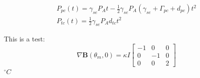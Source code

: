 \documentclass[pdftex,letterpaper,12pt]{report}
\begin{document}
	
\begin{subequations}\label{InitialSpinup}
	\begin{gather}
	P_{pc}(t)=\gamma_{se}P_{A}t-\frac{1}{2}\gamma_{se}P_{A}(\gamma_{se}+\Gamma_{pc}+d_{pc})t^{2}\\
	P_{tc}(t)=\frac{1}{2}\gamma_{se}P_{A}d_{tc}t^{2}
	\end{gather}
\end{subequations}

This is a test:
\begin{equation}
\nabla\boldsymbol{B}(\theta_m, 0)=\kappa I
\begin{bmatrix}
-1 & 0 & 0\\
0 & -1 & 0\\
0 & 0 & 2
\end{bmatrix}
\end{equation}
$^{\circ}C$
\end{document}

